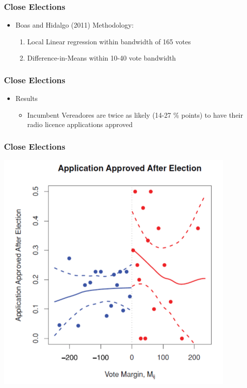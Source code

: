 \documentclass[xcolor=x11names,compress]{beamer}\usepackage[]{graphicx}\usepackage[]{color}
\renewcommand{\(}{\begin{columns}}
\renewcommand{\)}{\end{columns}}
\newcommand{\<}[1]{\begin{column}{#1}}
\renewcommand{\>}{\end{column}}
\begin{document}
\begin{frame}
\frametitle{Close Elections}
\begin{itemize}
\item Boas and Hidalgo (2011) Methodology:
\begin{enumerate}
\item Local Linear regression within bandwidth of 165 votes
\item Difference-in-Means within 10-40 vote bandwidth
\end{enumerate}
\end{itemize}
\end{frame}

\begin{frame}
\frametitle{Close Elections}
\begin{itemize}
\item Results
\begin{itemize}
\item Incumbent Vereadores are twice as likely (14-27 \% points) to have their radio licence applications approved
\end{itemize}
\end{itemize}
\end{frame}

\begin{frame}
\frametitle{Close Elections}
\begin{center}
\includegraphics[scale=0.31]{figure/BH_Results.png}
\end{center}
\end{frame}
\end{document}
